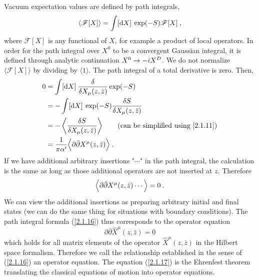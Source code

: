 Vacuum expectation values are defined by path integrals,    
\begin{equation}
	\langle\mathscr{F}[X]\rangle=\int[\mathrm{d} X]\: \exp (-S) \mathscr{F}[X] \:,
\end{equation}
where $\mathscr{F}[X]$ is any functional of $X$, for example a product of local operators. In order for the path integral over $X^{0}$ to be a convergent Gaussian integral, it is defined through analytic continuation $X^{0} \to -i X^{D}$. We do not normalize $\langle\mathscr{F}[X]\rangle$ by dividing by $\langle 1\rangle$.    
The path integral of a total derivative is zero. Then,    
\begin{align}
	0 &=\int[\dif X]\: \frac{\delta}{\delta X_{\mu}(z, \bar{z})} \exp (-S) \nonumber \\
	&=-\int[\dif X]\: \exp (-S) \frac{\delta S}{\delta X_{\mu}(z, \bar{z})} \nonumber  \\
	&=-\left\langle\frac{\delta S}{\delta X_{\mu}(z, \bar{z})}\right\rangle  \tag{can be simplified using \eqref{2.1.11}} \\
	&=\frac{1}{\pi \alpha^{\prime}}\Bigl\langle\partial \bar{\partial} X^{\mu}(z, \bar{z})\Bigr\rangle \:.
	\label{2.1.15}
\end{align}
If we have additional arbitrary insertions "$\cdots$" in the path integral, the calculation is the same as long as those additional operators are not inserted at $z$. Therefore    
\begin{equation}
	\Bigl\langle\partial \bar{\partial} X^{\mu}(z, \bar{z}) \cdots\Bigr\rangle=0 \:. \label{2.1.16}
\end{equation}
We can view the additional insertions as preparing arbitrary initial and final states (we can do the same thing for situations with boundary conditions).    
The path integral formula (\ref{2.1.16}) thus corresponds to the operator equation    
\begin{equation}
	\partial \bar{\partial} \hat{X}^{\mu}(z, \bar{z})=0 \label{2.1.17}
\end{equation}
which holds for all matrix elements of the operator $\hat{X}^{\mu}(z, \bar{z})$ in the Hilbert space formalism. Therefore we call the relationship established in the sense of (\ref{2.1.16}) an operator equation. The equation (\ref{2.1.17}) is the Ehrenfest theorem translating the classical equations of motion into operator equations.    

